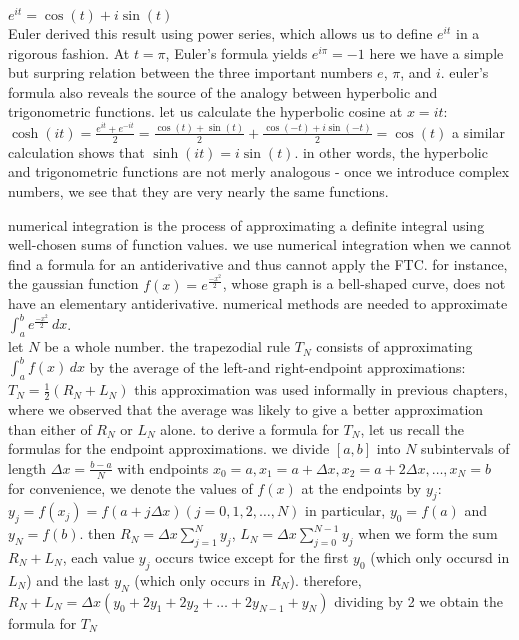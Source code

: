 \documentclass{article}
\begin{document}
$e^{it} = \cos(t) + i\sin(t)$\\

Euler derived this result using power series, which allows us to define $e^{it}$ in a rigorous fashion. At $t = \pi$, Euler's formula yields $e^{i\pi} = -1$ here we have a simple but surpring relation between the three important numbers $e$, $\pi$, and $i$. euler's formula also reveals the source of the analogy between hyperbolic and trigonometric functions. let us calculate the hyperbolic cosine at $x = it$: $\cosh(it) = \frac{e^{it} + e^{-it}}{2} = \frac{\cos(t) + \sin(t)}{2} + \frac{\cos(-t) + i\sin(-t)}{2} = \cos(t)$ a similar calculation shows that $\sinh(it) = i\sin(t)$. in other words, the hyperbolic and trigonometric functions are not merly analogous - once we introduce complex numbers, we see that they are very nearly the same functions.\\

\newpage

numerical integration is the process of approximating a definite integral using well-chosen sums of function values. we use numerical integration when we cannot find a formula for an antiderivative and thus cannot apply the FTC. for instance, the gaussian function $f(x) = e^{\frac{-x^2}{2}}$, whose graph is a bell-shaped curve, does not have an elementary antiderivative. numerical methods are needed to approximate $\int_{a}^{b}e^{\frac{-x^2}{2}}\,dx$.\\

let $N$ be a whole number. the trapezodial rule $T_N$ consists of approximating $\int_{a}^{b}f(x)\,dx$ by the average of the left-and right-endpoint approximations: $T_N = \frac{1}{2}(R_N + L_N)$ this approximation was used informally in previous chapters, where we observed that the average was likely to give a better approximation than either of $R_N$ or $L_N$ alone. to derive a formula for $T_N$, let us recall the formulas for the endpoint approximations. we divide $[a, b]$ into $N$ subintervals of length $\Delta x = \frac{b - a}{N}$ with endpoints $x_0 = a, x_1 = a + \Delta x, x_2 = a + 2\Delta x, \ldots, x_N = b$ for convenience, we denote the values of $f(x)$ at the endpoints by $y_j$: $y_j = f(x_j) = f(a + j\Delta x) (j = 0, 1, 2, \ldots, N)$ in particular, $y_0 = f(a)$ and $y_N = f(b)$. then $R_N = \Delta x\sum_{j=1}^{N}y_j$, $L_N = \Delta x\sum_{j=0}^{N-1}y_j$ when we form the sum $R_N + L_N$, each value $y_j$ occurs twice except for the first $y_0$ (which only occursd in $L_N$) and the last $y_N$ (which only occurs in $R_N$). therefore, $R_N + L_N = \Delta x(y_0 + 2y_1 + 2y_2 + \ldots + 2y_{N-1} + y_N)$ dividing by 2 we obtain the formula for $T_N$\\
\end{document}
